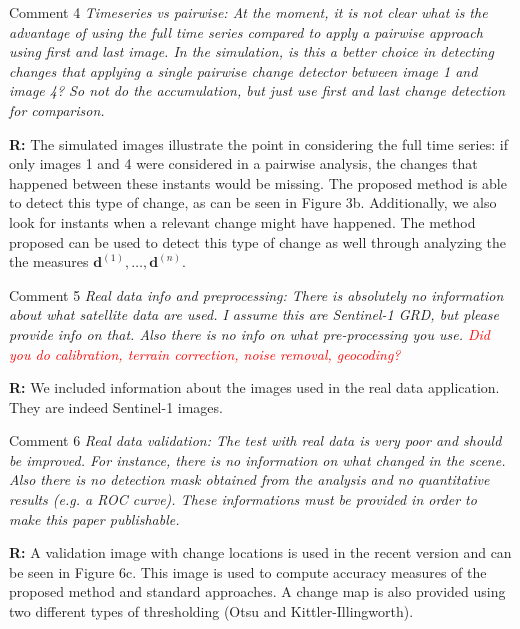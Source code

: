 \documentclass[11pt]{report}
\begin{document}
\medskip
\begin{mybox}{Comment 4}
\textit{Timeseries vs pairwise: At the moment, it is not clear what is the advantage of using the full time series
compared to apply a pairwise approach using first and last image. In the simulation, is this a better choice in
detecting changes that applying a single pairwise change detector between image 1 and image 4? So not do the
accumulation, but just use first and last change detection for comparison.}


\medskip
\textbf{R:} The simulated images illustrate the point in considering the full time series: if only images 1 and 4 were considered in a pairwise analysis, the changes that happened between these instants would be missing. The proposed method is able to detect this type of change, as can be seen in Figure 3b. Additionally, we also look for instants when a relevant change might have happened. The method proposed can be used to detect this type of change as well through analyzing the the measures $\mathbf{d}^{(1)},\ldots,\mathbf{d}^{(n)}$.
\end{mybox}

\medskip
\begin{mybox}{Comment 5}
\textit{Real data info and preprocessing: There is absolutely no information about what satellite data are used. I
assume this are Sentinel-1 GRD, but please provide info on that. Also there is no info on what pre-processing
you use. \textcolor{red}{Did you do calibration, terrain correction, noise removal, geocoding?}}


\medskip
\textbf{R:} We included information about the images used in the real data application. They are indeed Sentinel-1 images.
\end{mybox}

\medskip
\begin{mybox}{Comment 6}
\textit{Real data validation: The test with real data is very poor and should be improved. For instance, there is
no information on what changed in the scene. Also there is no detection mask obtained from the analysis and
no quantitative results (e.g. a ROC curve). These informations must be provided in order to make this paper
publishable.}


\medskip
\textbf{R:} A validation image with change locations is used in the recent version and can be seen in Figure 6c. This image is used to compute accuracy measures of the proposed method and standard approaches. A change map is also provided using two different types of thresholding (Otsu and Kittler-Illingworth).
\end{mybox}
\end{document}
